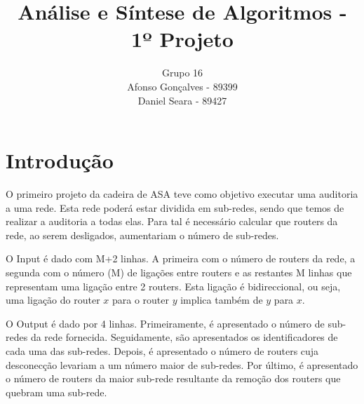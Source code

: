 \documentclass[12pt]{article}
\begin{document}
\title{Análise e Síntese de Algoritmos - 1º Projeto}
\author{Grupo 16 \\ Afonso Gonçalves - 89399 \\ Daniel Seara - 89427}
\date{}
\maketitle


\thispagestyle{fancy}


\section{Introdução}

O primeiro projeto da cadeira de ASA teve como objetivo executar uma auditoria a uma rede. Esta rede poderá estar dividida em sub-redes, 
sendo que temos de realizar a auditoria a todas elas. Para tal é necessário calcular que routers da rede, ao serem desligados, aumentariam o número de
sub-redes.\par

O Input é dado com M+2 linhas. A primeira com o número de routers da rede, a segunda com o número (M) de ligações entre routers e as restantes M linhas que 
representam uma ligação entre 2 routers. Esta ligação é bidireccional, ou seja, uma ligação do router $x$ para o router $y$ implica também de 
$y$ para $x$.\par

O Output é dado por 4 linhas. Primeiramente, é apresentado o número de sub-redes da rede fornecida. Seguidamente, são apresentados os identificadores de cada 
uma das sub-redes. Depois, é apresentado o número de routers cuja desconecção levariam a um número maior de sub-redes. Por último, é apresentado o número de routers 
da maior sub-rede resultante da remoção dos routers que quebram uma sub-rede.\par
\end{document}
